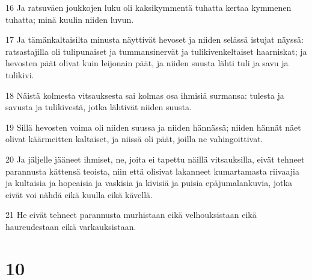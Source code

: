 \par 16 Ja ratsuväen joukkojen luku oli kaksikymmentä tuhatta kertaa kymmenen tuhatta; minä kuulin niiden luvun.
\par 17 Ja tämänkaltaisilta minusta näyttivät hevoset ja niiden selässä istujat näyssä: ratsastajilla oli tulipunaiset ja tummansinervät ja tulikivenkeltaiset haarniskat; ja hevosten päät olivat kuin leijonain päät, ja niiden suusta lähti tuli ja savu ja tulikivi.
\par 18 Näistä kolmesta vitsauksesta sai kolmas osa ihmisiä surmansa: tulesta ja savusta ja tulikivestä, jotka lähtivät niiden suusta.
\par 19 Sillä hevosten voima oli niiden suussa ja niiden hännässä; niiden hännät näet olivat käärmeitten kaltaiset, ja niissä oli päät, joilla ne vahingoittivat.
\par 20 Ja jäljelle jääneet ihmiset, ne, joita ei tapettu näillä vitsauksilla, eivät tehneet parannusta kättensä teoista, niin että olisivat lakanneet kumartamasta riivaajia ja kultaisia ja hopeaisia ja vaskisia ja kivisiä ja puisia epäjumalankuvia, jotka eivät voi nähdä eikä kuulla eikä kävellä.
\par 21 He eivät tehneet parannusta murhistaan eikä velhouksistaan eikä haureudestaan eikä varkauksistaan.

\chapter{10}

